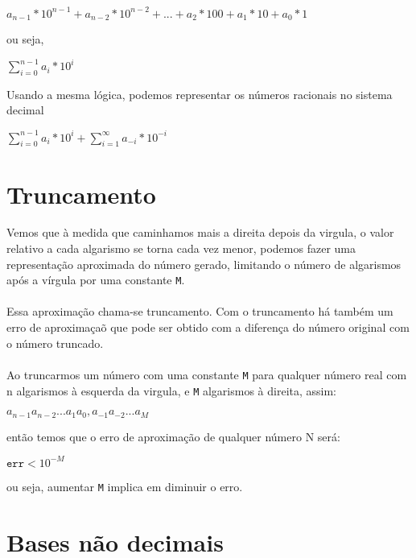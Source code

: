 \documentclass[12pt, onecolumn]{article}
\begin{document}
	\begin{center}
		$a_{n-1}*10^{n-1} + a_{n-2}*10^{n-2}+ ... + 
		a_{2}*100 + a_{1} * 10 + a_{0} * 1$
	\end{center}

	ou seja,

	\begin{center}
		$\sum_{i = 0}^{n - 1} a_{i} * 10^{i}$
	\end{center}

	Usando a mesma lógica, podemos representar os números racionais no sistema
	decimal
	
	\begin{center}
		$\sum_{i = 0}^{n - 1} a_{i} * 10^{i} + 
		\sum_{i = 1}^{\infty} a_{-i} * 10^{-i}$
	\end{center}

			\section{\centering Truncamento}

	Vemos que à medida que caminhamos mais a direita depois da virgula, o
	valor relativo a cada algarismo se torna cada vez menor, podemos
	fazer uma representação aproximada do número gerado, limitando 
	o número de algarismos após a vírgula por uma constante \texttt{M}.\\
	\\
	Essa aproximação chama-se truncamento. Com o truncamento há também
	um erro de aproximaçaõ que pode ser obtido com a diferença do número original
	com o número truncado.\\
	\\
	Ao truncarmos um número com uma constante \texttt{M} para qualquer 
	número real com n algarismos à esquerda da virgula, 
	e \texttt{M} algarismos à direita, assim: 

	\begin{center}
		$a_{n-1} a_{n-2} ... a_{1} a_{0}, a_{-1} a_{-2} ... a_{M}$
	\end{center}

	então temos que o erro de aproximação de qualquer número N será:

	\begin{center}
		$\texttt{err} < 10^{-M}$
	\end{center}
	
	ou seja, aumentar \texttt{M} implica em diminuir o erro.
	
			\section{\centering Bases não decimais}
\end{document}
